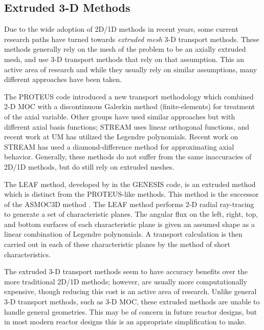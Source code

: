 {{    %
    
    
    

    \subsection{Extruded 3-D Methods}{\label{ssec:3T:Extruded 3-D Methods}
      Due to the wide adoption of 2D/1D methods in recent years, some current research paths have turned towards \emph{extruded mesh} 3-D transport methods.
      These methods generally rely on the mesh of the problem to be an axially extruded mesh, and use 3-D transport methods that rely on that assumption.
      This an active area of research and while they usually rely on similar assumptions, many different approaches have been taken.

      The PROTEUS \cite{Marin-Lafleche2013} code introduced a new transport methodology which combined 2-D \ac{MOC} with a discontinuous Galerkin method (finite-elements) for treatment of the axial variable.
      Other groups have used similar approaches but with different axial basis functions; STREAM \cite{Zheng2017} uses linear orthogonal functions, and recent work at \ac{UM} \cite{HerringExtruded} has utilized the Legendre polynomials.
      Recent work on STREAM has used a diamond-difference method for approximating axial behavior.%
      Generally, these methods do not suffer from the same inaccuracies of 2D/1D methods, but do still rely on extruded meshes.

      The \acf{LEAF} method, developed by \citet{Yamamoto2017} in the GENESIS code, is an extruded method which is distinct from the PROTEUS-like methods.
      This method is the successor of the ASMOC3D method \cite{Giho2008}.
      The \ac{LEAF} method performs 2-D radial ray-tracing to generate a set of characteristic planes.
      The angular flux on the left, right, top, and bottom surfaces of each characteristic plane is given an assumed shape as a linear combination of Legendre polynomials.
      A transport calculation is then carried out in each of these characteristic planes by the method of short characteristics.

      The extruded 3-D transport methods seem to have accuracy benefits over the more traditional 2D/1D methods;
        however, are usually more computationally expensive, though reducing this cost is an active area of research.
      Unlike general 3-D transport methods, such as 3-D \ac{MOC}, these extruded methods are unable to handle general geometries.
      This may be of concern in future reactor designs, but in most modern reactor designs this is an appropriate simplification to make.
    }
  }

}
